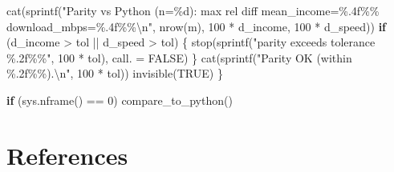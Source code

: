 \documentclass[
  letterpaper,
  DIV=11,
  numbers=noendperiod]{scrreprt}
\newenvironment{Shaded}{\begin{snugshade}}{\end{snugshade}}
\newcommand{\AttributeTok}[1]{\textcolor[rgb]{0.40,0.45,0.13}{#1}}
\newcommand{\ConstantTok}[1]{\textcolor[rgb]{0.56,0.35,0.01}{#1}}
\newcommand{\ControlFlowTok}[1]{\textcolor[rgb]{0.00,0.23,0.31}{\textbf{#1}}}
\newcommand{\DecValTok}[1]{\textcolor[rgb]{0.68,0.00,0.00}{#1}}
\newcommand{\FunctionTok}[1]{\textcolor[rgb]{0.28,0.35,0.67}{#1}}
\newcommand{\NormalTok}[1]{\textcolor[rgb]{0.00,0.23,0.31}{#1}}
\newcommand{\SpecialCharTok}[1]{\textcolor[rgb]{0.37,0.37,0.37}{#1}}
\newcommand{\StringTok}[1]{\textcolor[rgb]{0.13,0.47,0.30}{#1}}
\begin{document}
\begin{Shaded}
\begin{Highlighting}[]
  \FunctionTok{cat}\NormalTok{(}\FunctionTok{sprintf}\NormalTok{(}\StringTok{"Parity vs Python (n=\%d): max rel diff  mean\_income=\%.4f\%\%  download\_mbps=\%.4f\%\%}\SpecialCharTok{\textbackslash{}n}\StringTok{"}\NormalTok{,}
              \FunctionTok{nrow}\NormalTok{(m), }\DecValTok{100} \SpecialCharTok{*}\NormalTok{ d\_income, }\DecValTok{100} \SpecialCharTok{*}\NormalTok{ d\_speed))}
  \ControlFlowTok{if}\NormalTok{ (d\_income }\SpecialCharTok{\textgreater{}}\NormalTok{ tol }\SpecialCharTok{||}\NormalTok{ d\_speed }\SpecialCharTok{\textgreater{}}\NormalTok{ tol) \{}
    \FunctionTok{stop}\NormalTok{(}\FunctionTok{sprintf}\NormalTok{(}\StringTok{"parity exceeds tolerance \%.2f\%\%"}\NormalTok{, }\DecValTok{100} \SpecialCharTok{*}\NormalTok{ tol), }\AttributeTok{call. =} \ConstantTok{FALSE}\NormalTok{)}
\NormalTok{  \}}
  \FunctionTok{cat}\NormalTok{(}\FunctionTok{sprintf}\NormalTok{(}\StringTok{"Parity OK (within \%.2f\%\%).}\SpecialCharTok{\textbackslash{}n}\StringTok{"}\NormalTok{, }\DecValTok{100} \SpecialCharTok{*}\NormalTok{ tol))}
  \FunctionTok{invisible}\NormalTok{(}\ConstantTok{TRUE}\NormalTok{)}
\NormalTok{\}}

\ControlFlowTok{if}\NormalTok{ (}\FunctionTok{sys.nframe}\NormalTok{() }\SpecialCharTok{==} \DecValTok{0}\NormalTok{) }\FunctionTok{compare\_to\_python}\NormalTok{()}
\end{Highlighting}
\end{Shaded}


\chapter*{References}\label{references}

\end{document}

